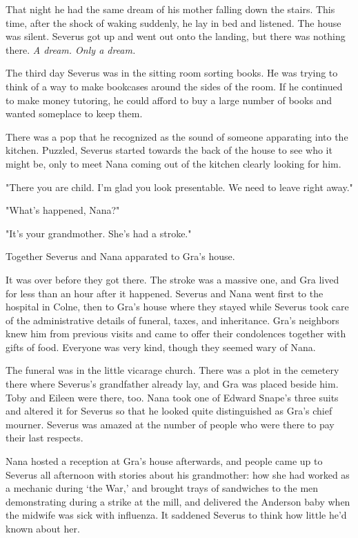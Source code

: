 That night he had the same dream of his mother falling down the stairs. This time, after the shock of waking suddenly, he lay in bed and listened. The house was silent. Severus got up and went out onto the landing, but there was nothing there. \emph{A dream. Only a dream.}

The third day Severus was in the sitting room sorting books. He was trying to think of a way to make bookcases around the sides of the room. If he continued to make money tutoring, he could afford to buy a large number of books and wanted someplace to keep them.

There was a pop that he recognized as the sound of someone apparating into the kitchen. Puzzled, Severus started towards the back of the house to see who it might be, only to meet Nana coming out of the kitchen clearly looking for him.

"There you are child. I'm glad you look presentable. We need to leave right away."

"What's happened, Nana?"

"It's your grandmother. She's had a stroke."

Together Severus and Nana apparated to Gra's house.

It was over before they got there. The stroke was a massive one, and Gra lived for less than an hour after it happened. Severus and Nana went first to the hospital in Colne, then to Gra's house where they stayed while Severus took care of the administrative details of funeral, taxes, and inheritance. Gra's neighbors knew him from previous visits and came to offer their condolences together with gifts of food. Everyone was very kind, though they seemed wary of Nana.

The funeral was in the little vicarage church. There was a plot in the cemetery there where Severus's grandfather already lay, and Gra was placed beside him. Toby and Eileen were there, too. Nana took one of Edward Snape's three suits and altered it for Severus so that he looked quite distinguished as Gra's chief mourner. Severus was amazed at the number of people who were there to pay their last respects.

Nana hosted a reception at Gra's house afterwards, and people came up to Severus all afternoon with stories about his grandmother: how she had worked as a mechanic during `the War,' and brought trays of sandwiches to the men demonstrating during a strike at the mill, and delivered the Anderson baby when the midwife was sick with influenza. It saddened Severus to think how little he'd known about her.

